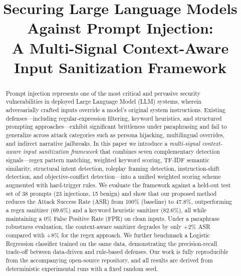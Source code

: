 \documentclass[10pt,conference]{IEEEtran}
\begin{document}
\title{Securing Large Language Models Against Prompt Injection:\\
A Multi-Signal Context-Aware Input Sanitization Framework}

\author{
}

\maketitle

\begin{abstract}
Prompt injection represents one of the most critical and pervasive
security vulnerabilities in deployed Large Language Model (LLM)
systems, wherein adversarially crafted inputs override a model's
original system instructions.
Existing defenses—including regular-expression filtering, keyword
heuristics, and structured prompting approaches—exhibit significant
brittleness under paraphrasing and fail to generalize across attack
categories such as persona hijacking, multilingual overrides, and
indirect narrative jailbreaks.
In this paper we introduce a \emph{multi-signal context-aware input
sanitization framework} that combines seven complementary detection
signals—regex pattern matching, weighted keyword scoring, TF-IDF
semantic similarity, structural intent detection, roleplay framing
detection, instruction-shift detection, and objective-conflict
detection—into a unified weighted scoring scheme augmented with
hard-trigger rules.
We evaluate the framework against a held-out test set of 38 prompts
(23 injections, 15 benign) and show that our proposed method reduces
the Attack Success Rate (ASR) from 100\% (baseline) to 47.8\%,
outperforming a regex sanitizer (69.6\%) and a keyword heuristic
sanitizer (82.6\%), all while maintaining a 0\% False Positive Rate
(FPR) on clean inputs.
Under a paraphrase robustness evaluation, the context-aware sanitizer
degrades by only +2\% ASR compared with +8\% for the regex approach.
We further benchmark a Logistic Regression classifier trained on
the same data, demonstrating the precision-recall trade-off between
data-driven and rule-based defenses.
Our work is fully reproducible from the accompanying open-source
repository, and all results are derived from deterministic
experimental runs with a fixed random seed.
\end{abstract}
\end{document}
